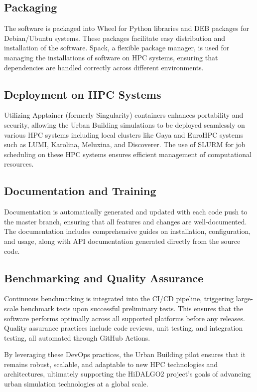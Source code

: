 \documentclass[runningheads]{llncs}
\begin{document}
\subsection{Packaging}
The software is packaged into Wheel for Python libraries and DEB packages for Debian/Ubuntu systems. These packages facilitate easy distribution and installation of the software. Spack, a flexible package manager, is used for managing the installations of software on HPC systems, ensuring that dependencies are handled correctly across different environments.

\subsection{Deployment on HPC Systems}
Utilizing Apptainer (formerly Singularity) containers enhances portability and security, allowing the Urban Building simulations to be deployed seamlessly on various HPC systems including local clusters like Gaya and EuroHPC systems such as LUMI, Karolina, Meluxina, and Discoverer. The use of SLURM for job scheduling on these HPC systems ensures efficient management of computational resources.

\subsection{Documentation and Training}
Documentation is automatically generated and updated with each code push to the master branch, ensuring that all features and changes are well-documented. The documentation includes comprehensive guides on installation, configuration, and usage, along with API documentation generated directly from the source code.

\subsection{Benchmarking and Quality Assurance}
Continuous benchmarking is integrated into the CI/CD pipeline, triggering large-scale benchmark tests upon successful preliminary tests. This ensures that the software performs optimally across all supported platforms before any releases. Quality assurance practices include code reviews, unit testing, and integration testing, all automated through GitHub Actions.

By leveraging these DevOps practices, the Urban Building pilot ensures that it remains robust, scalable, and adaptable to new HPC technologies and architectures, ultimately supporting the HiDALGO2 project's goals of advancing urban simulation technologies at a global scale.
\end{document}
